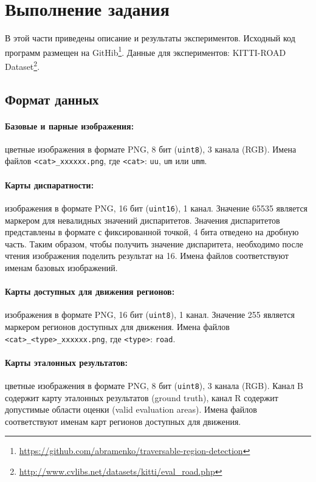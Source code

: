 \documentclass[oneside,final,12pt]{scrartcl}
\begin{document}
	\section{Выполнение задания}
		В этой части приведены описание и результаты экспериментов. Исходный код программ размещен на GitHib\footnote{\href{https://github.com/abramenko/traversable-region-detection}{https://github.com/abramenko/traversable-region-detection}}. Данные для экспериментов: KITTI-ROAD Dataset\footnote{\href{http://www.cvlibs.net/datasets/kitti/eval\_road.php}{http://www.cvlibs.net/datasets/kitti/eval\_road.php}}.

		\subsection{Формат данных}

			\paragraph{Базовые и парные изображения:} цветные изображения в формате PNG, 8 бит (\texttt{uint8}), 3 канала (RGB). Имена файлов \texttt{<cat>\_xxxxxx.png}, где \texttt{<cat>}: \texttt{uu}, \texttt{um} или \texttt{umm}.

			\paragraph{Карты диспаратности:} изображения в формате PNG, 16 бит (\texttt{uint16}), 1 канал. Значение 65535 является маркером для невалидных значений диспаритетов. Значения диспаритетов представлены в формате с фиксированной точкой, 4 бита отведено на дробную часть. Таким образом, чтобы получить значение диспаритета, необходимо после чтения изображения поделить результат на 16. Имена файлов соответствуют именам базовых изображений.

			\paragraph{Карты доступных для движения регионов:} изображения в формате PNG, 16 бит (\texttt{uint8}), 1 канал. Значение 255 является маркером регионов доступных для движения.
			Имена файлов \texttt{<cat>\_<type>\_xxxxxx.png}, где \texttt{<type>}: \texttt{road}.

			\paragraph{Карты эталонных результатов:} цветные изображения в формате PNG, 8 бит (\texttt{uint8}), 3 канала (RGB). Канал B содержит карту эталонных результатов (ground truth), канал R содержит допустимые области оценки (valid evaluation
			areas). Имена файлов соответствуют именам карт регионов доступных для движения.
\end{document}
